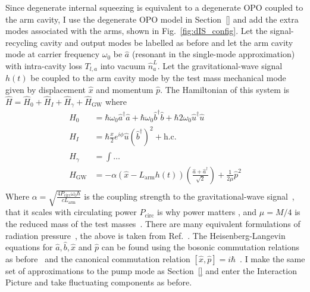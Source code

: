 Since degenerate internal squeezing is equivalent to a degenerate OPO coupled to the arm cavity, I use the degenerate OPO model in Section~\ref{} and add the extra modes associated with the arms, shown in Fig.~\ref{fig:dIS_config}. Let the signal-recycling cavity and output modes be labelled as before and let the arm cavity mode at carrier frequency $\omega_0$ be $\hat a$ (resonant in the single-mode approximation) with intra-cavity loss $T_{l,a}$ into vacuum $\hat n^L_a$. Let the gravitational-wave signal $h(t)$ be coupled to the arm cavity mode by the test mass mechanical mode given by displacement $\hat x$ and momentum $\hat p$. 
The Hamiltonian of this system is $\hat H = \hat H_0 + \hat H_I + \hat H_\gamma + \hat H_\text{GW}$ where~\cite{}
\begin{align}
\hat H_0 &= \hbar \omega_0 \hat a^\dag \hat a + \hbar \omega_0 \hat b^\dag \hat b + \hbar 2\omega_0 \hat u^\dag \hat u\\
\hat H_I &= \hbar \frac{x}{2} e^{i\phi} \hat u (\hat b^\dag)^2 + \text{h.c.}\\
\hat H_\gamma &= \int \ldots \\
\hat H_\text{GW} &= -\alpha (\hat{x}-L_\mathrm{arm}h(t))(\frac{\hat{a}+\hat{a}^\dag}{\sqrt{2}})+\frac{1}{2\mu}\hat{p}^2 \\
\end{align}
Where $\alpha=\sqrt{\frac{4 P_\text{circ} \omega_0 \hbar}{c  L_\text{arm}}}$  is the coupling strength to the gravitational-wave signal~\cite{}, that it scales with circulating power $P_\text{circ}$ is why power matters , and $\mu=M/4$ is the reduced mass of the test masses~\cite{}. There are many equivalent formulations of radiation pressure~\cite{optomechanics textbook}, the above is taken from Ref.~\cite{Li2020,original source?}. 
The Heisenberg-Langevin equations for $\hat a, \hat b, \hat x$ and $\hat p$ can be found using the bosonic commutation relations as before~\cite{} and the canonical commutation relation $[\hat x,\hat p]=i\hbar$~\cite{}. I make the same set of approximations to the pump mode as Section~\ref{} and enter the Interaction Picture and take fluctuating components as before.



